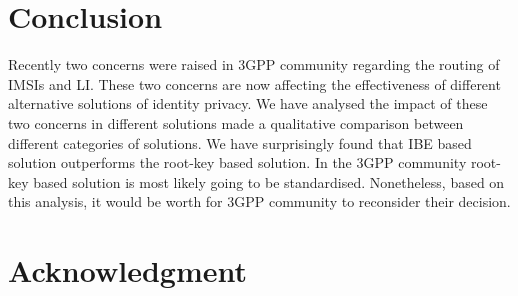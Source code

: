 \documentclass[conference]{IEEEtran}
\begin{document}
\section{Conclusion}
Recently two concerns were raised in 3GPP community regarding the routing of IMSIs and LI. These two concerns are now affecting the effectiveness of different alternative solutions of identity privacy. We have analysed the impact of these two concerns in different solutions made a qualitative comparison between different categories of solutions. We have surprisingly found that IBE based solution outperforms the root-key based solution. In the 3GPP community root-key based solution is most likely going to be standardised. Nonetheless, based on this analysis, it would be worth for 3GPP community to reconsider their decision.

\section*{Acknowledgment}
\end{document}

